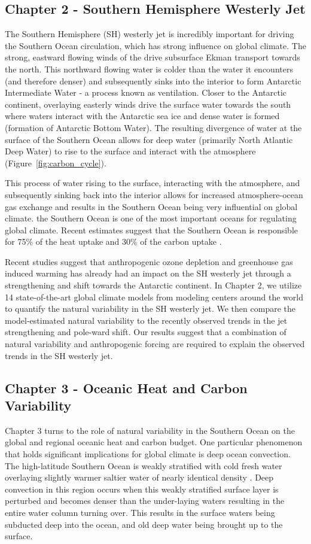 \subsection{Chapter 2 - Southern Hemisphere Westerly Jet}
The Southern Hemisphere (SH) westerly jet is incredibly important for driving the
Southern Ocean circulation, which has strong influence on global climate. The
strong, eastward flowing winds of the drive subsurface Ekman transport towards
the north. This northward flowing water is colder than the water it encounters
(and therefore denser) and subsequently sinks into the interior to form Antarctic
Intermediate Water - a process known as ventilation. Closer to the Antarctic
continent, overlaying easterly winds drive the surface water towards the south
where waters interact with the Antarctic sea ice and dense water is formed
(formation of Antarctic Bottom Water). The resulting divergence of water at the
surface of the Southern Ocean allows for deep water (primarily North Atlantic
Deep Water) to rise to the surface and interact with the atmosphere
(Figure~\ref{fig:carbon_cycle}).

This process of water rising to the surface, interacting with the atmosphere,
and subsequently sinking back into the interior allows for increased
atmosphere-ocean gas exchange and results in the Southern Ocean being very
influential on global climate. the Southern Ocean is one of the most important
oceans for regulating global climate. Recent estimates suggest that the Southern
Ocean is responsible for 75\% of the heat uptake and 30\% of the carbon uptake
\citep{Frolicher2015}.

Recent studies suggest that anthropogenic ozone depletion and greenhouse gas
induced warming has already had an impact on the SH westerly jet through a strengthening
and shift towards the Antarctic continent. In Chapter 2, we utilize 14
state-of-the-art global climate models from modeling centers around the world to
quantify the natural variability in the SH westerly jet. We then compare the
model-estimated natural variability to the recently observed trends in the jet
strengthening and pole-ward shift. Our results suggest that a combination of
natural variability and anthropogenic forcing are required to explain the observed
trends in the SH westerly jet.

\subsection{Chapter 3 - Oceanic Heat and Carbon Variability}
Chapter 3 turns to the role of natural variability in the Southern Ocean on the
global and regional oceanic heat and carbon budget. One particular phenomenon
that holds significant implications for global climate is deep ocean convection.
The high-latitude Southern Ocean is weakly stratified with cold fresh water
overlaying slightly warmer saltier water of nearly identical density
\citep{Martinson1991}. Deep convection in this region occurs when this weakly
stratified surface layer is perturbed and becomes denser than the under-laying
waters resulting in the entire water column turning over. This results in the
surface waters being subducted deep into the ocean, and old deep water being
brought up to the surface.

